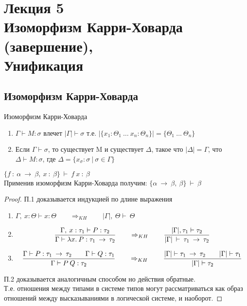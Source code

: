 \section{Лекция 5 \\ Изоморфизм Карри-Ховарда (завершение), \\Унификация}
		\subsection{Изоморфизм Карри-Ховарда}
	\begin{definition}Изоморфизм Карри-Ховарда\end{definition}

	\begin{enumerate}
		\item $\Gamma\vdash M:\sigma$ влечет $|\Gamma|\vdash \sigma$ т.е. $|\{x_1:\Theta_1\:\hdots \:x_n:\Theta_n\}|=\{\Theta_1\:\hdots\:\Theta_n\}$
		\item Если $\Gamma\vdash\sigma$, то существует M и существует $\Delta$, такое что $|\Delta|=\Gamma$, что $\Delta \vdash M: \sigma$, где $\Delta=\{x_{\sigma} : \sigma\:|\:\sigma\in\Gamma  \}$
	\end{enumerate}
	\begin{example}
	$\{f\: :\:\alpha\:\rightarrow\:\beta,\:x\: :\:\beta\}\:\vdash\:f\:x\::\:\beta$ \\Применив изоморфизм Карри-Ховарда получим: $\{\alpha\:\rightarrow\:\beta,\:\beta\}\:\vdash\:\beta$
	\end{example}
	\begin{proof}
		\par П.1 доказывается индукцией по длине выражения
			\begin{enumerate}
				\item $\Gamma,\:x:\Theta\vdash x:\Theta \qquad \Rightarrow_{KH} \qquad |\Gamma|,\:\Theta\vdash\:\Theta$
				\item $${\Gamma,\:x:\tau_1\vdash P:\tau_2 \over \Gamma \vdash \lambda x.\:P:\tau_1\:\rightarrow\:\tau_2} \qquad \Rightarrow_{KH} \qquad {|\Gamma|, \tau_1\vdash\tau_2\over |\Gamma|\:\vdash\:\tau_1\:\rightarrow\:\tau_2}$$
				\item $${\Gamma\vdash P:\tau_1\:\rightarrow\:\tau_2 \hspace{2em} \Gamma\vdash Q:\tau_1 \over \Gamma \vdash P\:Q:\tau_2} \qquad \Rightarrow_{KH} \qquad {|\Gamma|\vdash \tau_1\:\rightarrow\:\tau_2 \hspace{2em} |\Gamma|\vdash \tau_1 \over |\Gamma| \vdash \tau_2}$$
			\end{enumerate}
\par П.2 доказывается аналогичным способом но действия обратные.\\
Т.е. отношения между типами в системе типов могут рассматриваться как образ отношений между высказываниями в логической системе, и наоборот.
\end{proof}

